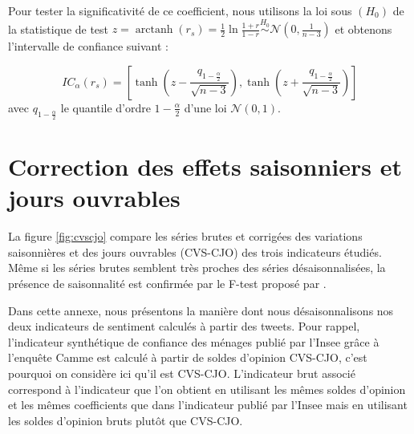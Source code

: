 \documentclass[11pt,french,french]{article}
\DeclareMathOperator{\arctanh}{arctanh}
\begin{document}
Pour tester la significativité de ce coefficient, nous utilisons la loi
sous \((H_0)\) de la statistique de test
\(z = \arctanh(r_s) = \frac{1}{2} \ln\frac{1+r}{1-r} \overset{H_0}{\sim}\mathcal{N}(0, \frac{1}{n-3})\)
et obtenons l'intervalle de confiance suivant :

\[
IC_\alpha (r_s) = \left[\tanh\left(z-\frac{q_{1-\frac{\alpha}{2}}}{\sqrt{n-3}}\right),
\tanh\left(z+\frac{q_{1-\frac{\alpha}{2}}}{\sqrt{n-3}}\right)\right]
\] avec \(q_{1-\frac{\alpha}{2}}\) le quantile d'ordre
\(1-\frac{\alpha}{2}\) d'une loi \(\mathcal{N}(0, 1)\).

\newpage

\section{Correction des effets saisonniers et jours
ouvrables}\label{annexe:cvscjo}

La figure \ref{fig:cvscjo} compare les séries brutes et corrigées des
variations saisonnières et des jours ouvrables (CVS-CJO) des trois
indicateurs étudiés. Même si les séries brutes semblent très proches des
séries désaisonnalisées, la présence de saisonnalité est confirmée par
le F-test proposé par \cite{lytras}.

Dans cette annexe, nous présentons la manière dont nous désaisonnalisons
nos deux indicateurs de sentiment calculés à partir des tweets. Pour
rappel, l'indicateur synthétique de confiance des ménages publié par
l'Insee grâce à l'enquête Camme est calculé à partir de soldes d'opinion
CVS-CJO, c'est pourquoi on considère ici qu'il est CVS-CJO. L'indicateur
brut associé correspond à l'indicateur que l'on obtient en utilisant les
mêmes soldes d'opinion et les mêmes coefficients que dans l'indicateur
publié par l'Insee mais en utilisant les soldes d'opinion bruts plutôt
que CVS-CJO.
\end{document}

